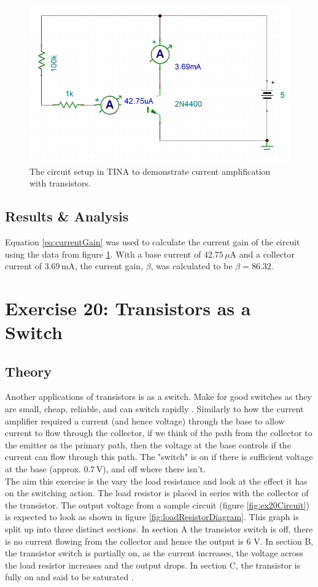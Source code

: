 \documentclass[%
reprint,
amsmath,amssymb,
aps,
floatfix
]{revtex4-2}
\begin{document}
		\begin{figure}
			\includegraphics[width=0.85\columnwidth]{circuitOn.png}
			\caption{\label{fig:currentAmplifier}The circuit setup in TINA to demonstrate current amplification with transistors.}
		\end{figure}
		
		\subsection{Results \& Analysis}
		Equation \ref{eq:currentGain} was used to calculate the current gain of the circuit using the data from figure \ref{fig:currentAmplifier}. With a base current of $42.75 \,\mu\text{A}$ and a collector current of $3.69 \,\text{mA}$, the current gain, $\beta$, was calculated to be $\beta = 86.32$.
	
	\section{Exercise 20: Transistors as a Switch}
		\subsection{Theory}
		Another applications of transistors is as a switch. Make for good switches as they are small, cheap, reliable, and can switch rapidly \cite{manual}. Similarly to how the current amplifier required a current (and hence voltage) through the base to allow current to flow through the collector, if we think of the path from the collector to the emitter as the primary path, then the voltage at the base controls if the current can flow through this path. The "switch" is on if there is sufficient voltage at the base (approx. $0.7 \,\text{V}$), and off where there isn't.\\
		
		The aim this exercise is the vary the load resistance and look at the effect it has on the switching action. The load resistor is placed in series with the collector of the transistor. The output voltage from a sample circuit (figure \ref{fig:ex20Circuit}) is expected to look as shown in figure \ref{fig:loadResistorDiagram}. This graph is split up into three distinct sections. In section A the transistor switch is off, there is no current flowing from the collector and hence the output is 6 V. In section B, the transistor switch is partially on, as the current increases, the voltage across the load resistor increases and the output drops. In section C, the transistor is fully on and said to be saturated \cite{manual}.
		
\end{document}
